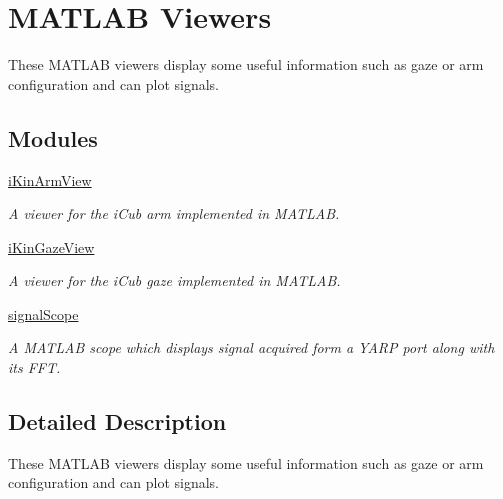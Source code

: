 \section{M\+A\+T\+L\+AB Viewers}
\label{group__icub__matlabViewers}


These M\+A\+T\+L\+AB viewers display some useful information such as gaze or arm configuration and can plot signals.  


\subsection*{Modules}
\begin{DoxyCompactItemize}
\item 
\hyperlink{group__icub__iKinArmView}{i\+Kin\+Arm\+View}
\begin{DoxyCompactList}\small\item\em A viewer for the i\+Cub arm implemented in M\+A\+T\+L\+AB. \end{DoxyCompactList}\item 
\hyperlink{group__icub__iKinGazeView}{i\+Kin\+Gaze\+View}
\begin{DoxyCompactList}\small\item\em A viewer for the i\+Cub gaze implemented in M\+A\+T\+L\+AB. \end{DoxyCompactList}\item 
\hyperlink{group__icub__signalScope}{signal\+Scope}
\begin{DoxyCompactList}\small\item\em A M\+A\+T\+L\+AB scope which displays signal acquired form a Y\+A\+RP port along with its F\+FT. \end{DoxyCompactList}\end{DoxyCompactItemize}


\subsection{Detailed Description}
These M\+A\+T\+L\+AB viewers display some useful information such as gaze or arm configuration and can plot signals. 

